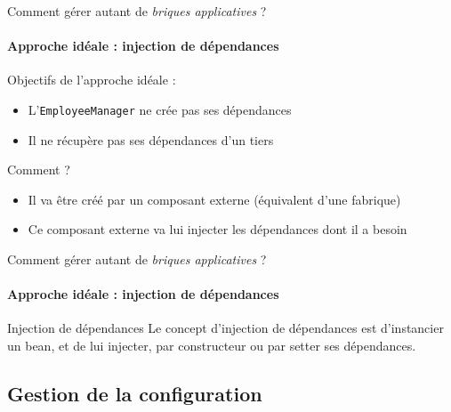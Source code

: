 \begin{frame}{Comment gérer autant de \emph{briques applicatives} ?}
	\framesubtitle{Approche idéale : injection de dépendances}

	Objectifs de l'approche idéale :
	\begin{itemize}
	\item L'\texttt{EmployeeManager} ne crée pas ses dépendances
	\item Il ne récupère pas ses dépendances d'un tiers
	\end{itemize}

	\pause
	Comment ?
	\begin{itemize}
	\item Il va être créé par un composant externe (équivalent d'une fabrique)
	\item Ce composant externe va lui injecter les dépendances dont il a besoin
	\end{itemize}

\end{frame}


\begin{frame}{Comment gérer autant de \emph{briques applicatives} ?}
	\framesubtitle{Approche idéale : injection de dépendances}

	\begin{block}{Injection de dépendances}
	Le concept d'injection de dépendances est d'instancier un bean, et de lui injecter, par constructeur ou par setter ses dépendances.
	\end{block}
\end{frame}


\subsection{Gestion de la configuration}

